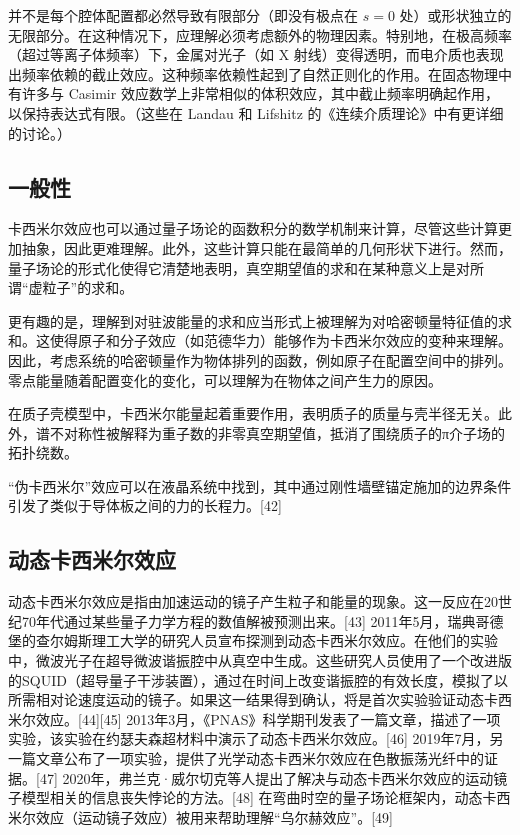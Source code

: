 并不是每个腔体配置都必然导致有限部分（即没有极点在 \( s = 0 \) 处）或形状独立的无限部分。在这种情况下，应理解必须考虑额外的物理因素。特别地，在极高频率（超过等离子体频率）下，金属对光子（如 X 射线）变得透明，而电介质也表现出频率依赖的截止效应。这种频率依赖性起到了自然正则化的作用。在固态物理中有许多与 Casimir 效应数学上非常相似的体积效应，其中截止频率明确起作用，以保持表达式有限。（这些在 Landau 和 Lifshitz 的《连续介质理论》中有更详细的讨论。）
\subsection{一般性}
卡西米尔效应也可以通过量子场论的函数积分的数学机制来计算，尽管这些计算更加抽象，因此更难理解。此外，这些计算只能在最简单的几何形状下进行。然而，量子场论的形式化使得它清楚地表明，真空期望值的求和在某种意义上是对所谓“虚粒子”的求和。

更有趣的是，理解到对驻波能量的求和应当形式上被理解为对哈密顿量特征值的求和。这使得原子和分子效应（如范德华力）能够作为卡西米尔效应的变种来理解。因此，考虑系统的哈密顿量作为物体排列的函数，例如原子在配置空间中的排列。零点能量随着配置变化的变化，可以理解为在物体之间产生力的原因。

在质子壳模型中，卡西米尔能量起着重要作用，表明质子的质量与壳半径无关。此外，谱不对称性被解释为重子数的非零真空期望值，抵消了围绕质子的π介子场的拓扑绕数。

“伪卡西米尔”效应可以在液晶系统中找到，其中通过刚性墙壁锚定施加的边界条件引发了类似于导体板之间的力的长程力。[42]
\subsection{动态卡西米尔效应}
动态卡西米尔效应是指由加速运动的镜子产生粒子和能量的现象。这一反应在20世纪70年代通过某些量子力学方程的数值解被预测出来。[43] 2011年5月，瑞典哥德堡的查尔姆斯理工大学的研究人员宣布探测到动态卡西米尔效应。在他们的实验中，微波光子在超导微波谐振腔中从真空中生成。这些研究人员使用了一个改进版的SQUID（超导量子干涉装置），通过在时间上改变谐振腔的有效长度，模拟了以所需相对论速度运动的镜子。如果这一结果得到确认，将是首次实验验证动态卡西米尔效应。[44][45] 2013年3月，《PNAS》科学期刊发表了一篇文章，描述了一项实验，该实验在约瑟夫森超材料中演示了动态卡西米尔效应。[46] 2019年7月，另一篇文章公布了一项实验，提供了光学动态卡西米尔效应在色散振荡光纤中的证据。[47] 2020年，弗兰克·威尔切克等人提出了解决与动态卡西米尔效应的运动镜子模型相关的信息丧失悖论的方法。[48] 在弯曲时空的量子场论框架内，动态卡西米尔效应（运动镜子效应）被用来帮助理解“乌尔赫效应”。[49]
